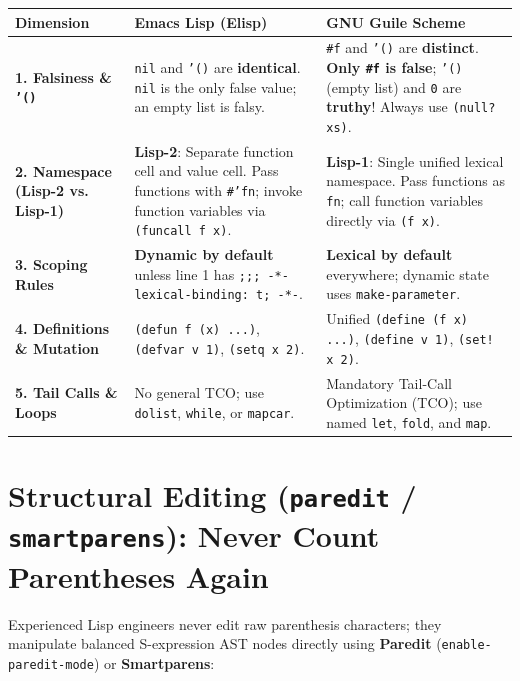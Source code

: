 \documentclass[11pt,oneside]{book}
\begin{document}
\begin{center}
\begin{tabularx}{\textwidth}{lXX}
\toprule
\textbf{Dimension} & \textbf{Emacs Lisp (Elisp)} & \textbf{GNU Guile Scheme} \\
\midrule
\textbf{1. Falsiness \& \texttt{'()}} & \texttt{nil} and \texttt{'()} are \textbf{identical}. \texttt{nil} is the only false value; an empty list is falsy. & \texttt{\#f} and \texttt{'()} are \textbf{distinct}. \textbf{Only \texttt{\#f} is false}; \texttt{'()} (empty list) and \texttt{0} are \textbf{truthy}! Always use \texttt{(null? xs)}. \\
\textbf{2. Namespace (Lisp-2 vs. Lisp-1)} & \textbf{Lisp-2}: Separate function cell and value cell. Pass functions with \texttt{\#'fn}; invoke function variables via \texttt{(funcall f x)}. & \textbf{Lisp-1}: Single unified lexical namespace. Pass functions as \texttt{fn}; call function variables directly via \texttt{(f x)}. \\
\textbf{3. Scoping Rules} & \textbf{Dynamic by default} unless line 1 has \texttt{;;; -*- lexical-binding: t; -*-}. & \textbf{Lexical by default} everywhere; dynamic state uses \texttt{make-parameter}. \\
\textbf{4. Definitions \& Mutation} & \texttt{(defun f (x) ...)}, \texttt{(defvar v 1)}, \texttt{(setq x 2)}. & Unified \texttt{(define (f x) ...)}, \texttt{(define v 1)}, \texttt{(set! x 2)}. \\
\textbf{5. Tail Calls \& Loops} & No general TCO; use \texttt{dolist}, \texttt{while}, or \texttt{mapcar}. & Mandatory Tail-Call Optimization (TCO); use named \texttt{let}, \texttt{fold}, and \texttt{map}. \\
\bottomrule
\end{tabularx}
\end{center}

\section{Structural Editing (\texttt{paredit} / \texttt{smartparens}): Never Count Parentheses Again}

Experienced Lisp engineers never edit raw parenthesis characters; they manipulate balanced S-expression AST nodes directly using \textbf{Paredit} (\texttt{enable-paredit-mode}) or \textbf{Smartparens}:
\end{document}
